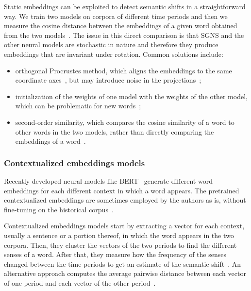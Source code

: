 \documentclass[runningheads]{llncs}
\begin{document}
Static embeddings can be exploited to detect semantic shifts in a straightforward way. We train two models on corpora of different time periods and then we measure the cosine distance between the embeddings of a given word obtained from the two models~\cite{hamilton-etal-2016-diachronic}. The issue in this direct comparison is that SGNS and the other neural models are stochastic in nature and therefore they produce embeddings that are invariant under rotation. Common solutions include:

\begin{itemize}
    \item orthogonal Procrustes method, which aligns the embeddings to the same coordinate axes~\cite{hamilton-etal-2016-diachronic}, but may introduce noise in the projections~\cite{dubossarsky-etal-2019-time};
    \item initialization of the weights of one model with the weights of the other model, which can be problematic for new words~\cite{kutuzov-etal-2018-diachronic,tahmasebi-etal-2018-survey};
    \item second-order similarity, which compares the cosine similarity of a word to other words in the two models, rather than directly comparing the embeddings of a word~\cite{kutuzov-etal-2018-diachronic,tahmasebi-etal-2018-survey}.   
\end{itemize}

\subsubsection{Contextualized embeddings models} Recently developed neural models like BERT~\cite{devlin-etal-2018-bert} generate different word embeddings for each different context in which a word appears. The pretrained contextualized embeddings are sometimes employed by the authors as is, without fine-tuning on the historical corpus~\cite{rother-etal-2020-cmce,laicher-etal-2021-explaining}. 

Contextualized embeddings models start by extracting a vector for each context, usually a sentence or a portion thereof, in which the word appears in the two corpora. Then, they cluster the vectors of the two periods to find the different senses of a word. After that, they measure how the frequency of the senses changed between the time periods to get an estimate of the semantic shift~\cite{giulianelli-etal-2020-analysing,rother-etal-2020-cmce}. An alternative approach computes the average pairwise distance between each vector of one period and each vector of the other period~\cite{laicher-etal-2021-explaining}.  
 
\end{document}
